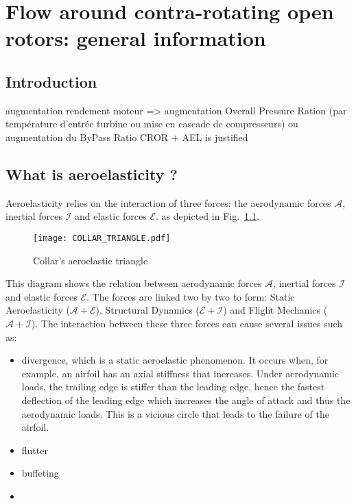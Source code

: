 
\chapter{Flow around contra-rotating open rotors: general information} %
\label{cha:cror}

\section{Introduction} %
\label{sec:introduction}
augmentation rendement moteur 
=> augmentation Overall Pressure Ration (par température d'entrée turbine 
ou mise en cascade de compresseurs)
ou augmentation du ByPass Ratio
CROR + AEL is justified


\section{What is aeroelasticity ?} %
\label{sec:what_is_aeroelasticity_}

Aeroelasticity relies on the interaction of three forces:
the aerodynamic forces $\mathcal{A}$,
inertial forces $\mathcal{I}$ and elastic forces $\mathcal{E}$.
as depicted in Fig.~\ref{fig:COLLAR_TRIANGLE}.
\begin{figure}[htbp]
  \centering
  \texttt{[image: COLLAR\_TRIANGLE.pdf]}
  \caption{Collar's aeroelastic triangle}
  \label{fig:COLLAR_TRIANGLE}
\end{figure}
This diagram shows the relation between aerodynamic forces $\mathcal{A}$,
inertial forces $\mathcal{I}$ and elastic forces $\mathcal{E}$.
The forces are linked two by two to form: Static Aeroelasticity ($\mathcal{A} + \mathcal{E}$),
Structural Dynamics ($\mathcal{E} + \mathcal{I}$) and Flight Mechanics ($\mathcal{A} + \mathcal{I}$).
The interaction between these three forces can cause several issues such as:
\begin{itemize}
	\item divergence, which is a static aeroelastic phenomenon.
	It occurs when, for example, an airfoil has an axial stiffness that increases.
	Under aerodynamic loads, the trailing edge is stiffer than the leading
	edge, hence the fastest deflection of the leading edge which increases the
	angle of attack and thus the aerodynamic loads. This is a vicious circle that
	leads to the failure of the airfoil.
	\item flutter
	\item buffeting
	\item 
\end{itemize}


